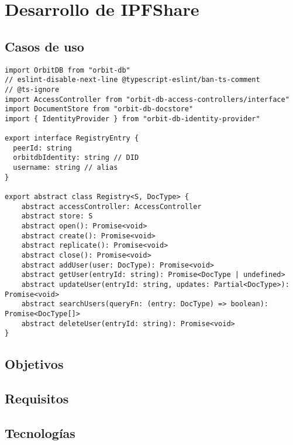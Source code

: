 \chapter{Desarrollo de IPFShare}\label{chap:3desarrollo}

\section{Casos de uso}

\begin{verbatim}
import OrbitDB from "orbit-db"
// eslint-disable-next-line @typescript-eslint/ban-ts-comment
// @ts-ignore
import AccessController from "orbit-db-access-controllers/interface"
import DocumentStore from "orbit-db-docstore"
import { IdentityProvider } from "orbit-db-identity-provider"

export interface RegistryEntry {
  peerId: string
  orbitdbIdentity: string // DID
  username: string // alias
}

export abstract class Registry<S, DocType> {
    abstract accessController: AccessController
    abstract store: S
    abstract open(): Promise<void> 
    abstract create(): Promise<void>
    abstract replicate(): Promise<void>
    abstract close(): Promise<void>
    abstract addUser(user: DocType): Promise<void>
    abstract getUser(entryId: string): Promise<DocType | undefined>
    abstract updateUser(entryId: string, updates: Partial<DocType>): Promise<void>
    abstract searchUsers(queryFn: (entry: DocType) => boolean): Promise<DocType[]>
    abstract deleteUser(entryId: string): Promise<void>
}

\end{verbatim}

\section{Objetivos}


\section{Requisitos}


\section{Tecnologías}
